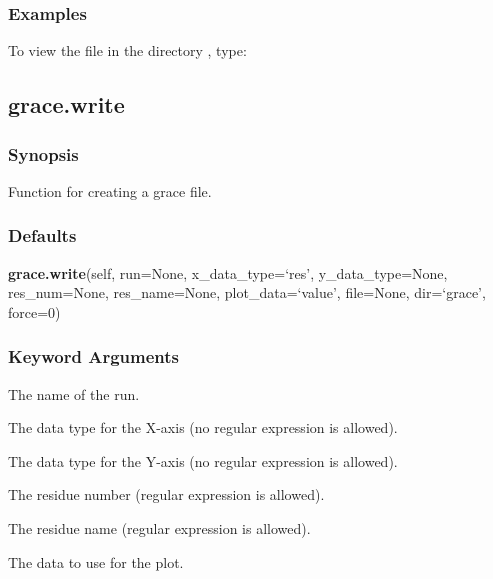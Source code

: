 \subsubsection{Examples}

To view the file  in the directory , type:






\newpage

\subsection{grace.write}


\subsubsection{Synopsis}

Function for creating a grace  file.



\subsubsection{Defaults}

\textsf{\textbf{grace.write}(self, run=None, x\_data\_type=`res', y\_data\_type=None, res\_num=None, res\_name=None, plot\_data=`value', file=None, dir=`grace', force=0)}


\subsubsection{Keyword Arguments}

  The name of the run. 

  The data type for the X-axis (no regular expression is allowed). 

  The data type for the Y-axis (no regular expression is allowed). 

  The residue number (regular expression is allowed). 

  The residue name (regular expression is allowed). 

  The data to use for the plot. 

